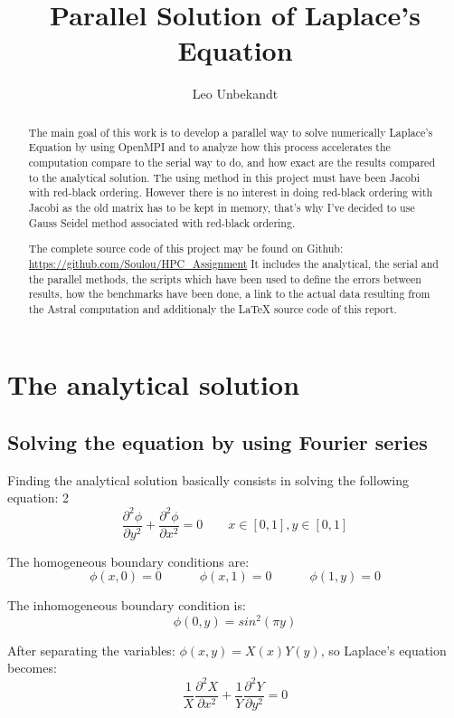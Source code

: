 \documentclass[a4paper,11pt]{article}
\title{Parallel Solution of Laplace's Equation}
\author{Leo Unbekandt}
\begin{document}
\maketitle
\tableofcontents

\begin{abstract}
  The main goal of this work is to develop a parallel way to solve numerically Laplace's Equation by using OpenMPI
  and to analyze how this process accelerates the computation compare to the serial way to do, and how exact are the
  results compared to the analytical solution. The using method in this project must have been Jacobi with red-black
  ordering. However there is no interest in doing red-black ordering with Jacobi as the old matrix has to be kept in
  memory, that's why I've decided to use Gauss Seidel method associated with red-black ordering.
  
  The complete source code of this project may be found on Github: \url{https://github.com/Soulou/HPC_Assignment}
  It includes the analytical, the serial and the parallel methods, the scripts which have been used to define the
  errors between results, how the benchmarks have been done, a link to the actual data resulting from the Astral
  computation and additionaly the \LaTeX \hspace{5pt} source code of this report.
\end{abstract}

\section{The analytical solution}
\subsection{Solving the equation by using Fourier series}

Finding the analytical solution basically consists in solving the following equation:
2$$\frac{\partial^2 \phi}{\partial y^2} + \frac{\partial^2 \phi}{\partial x^2} = 0 \hspace{2em} x \in [0,1], y \in [0,1]$$

\noindent The homogeneous boundary conditions are:
$$\phi(x,0) = 0 \hspace{3em} \phi(x,1) = 0 \hspace{3em} \phi(1,y) = 0$$

\noindent The inhomogeneous boundary condition is:
$$\phi(0,y) = sin^2(\pi y)$$

\noindent After separating the variables: $\phi(x,y) = X(x)Y(y)$, so Laplace's equation becomes:
$$\frac{1}{X}\frac{\partial^2 X}{\partial x^2} + \frac{1}{Y}\frac{\partial^2 Y}{\partial y^2} = 0$$
\end{document}
